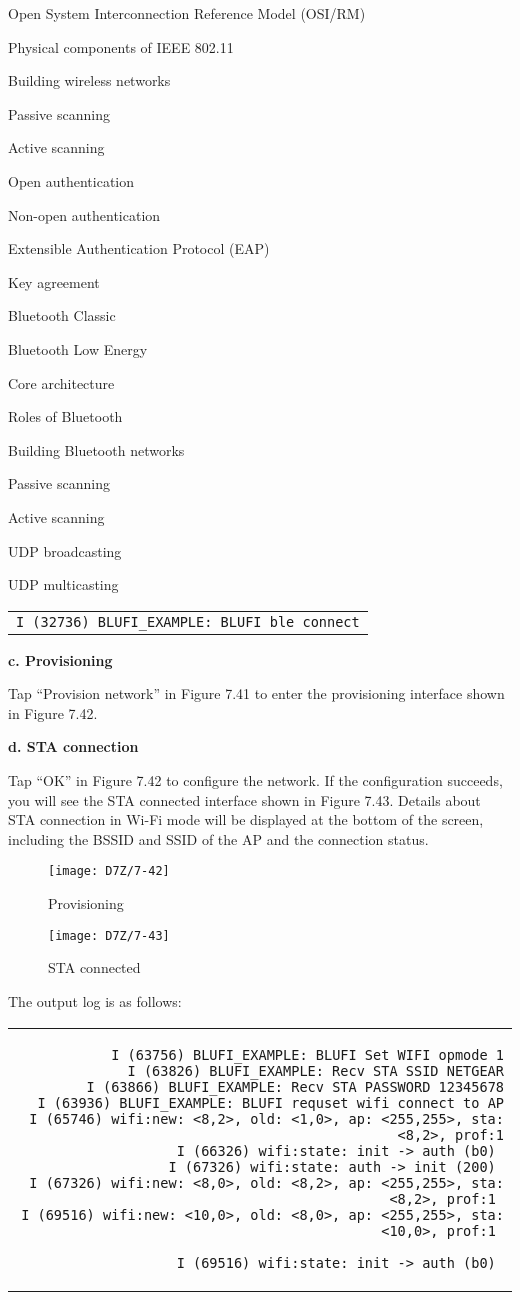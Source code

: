 \documentclass[a4paper,12pt]{book}
\begin{document}
\begin{term}{Open System Interconnection Reference Model (OSI/RM)}
\begin{term}{Physical components of IEEE 802.11}
\begin{term}{Building wireless networks}
\begin{term}{Passive scanning}
\begin{term}{Active scanning}
\begin{term}{Open authentication}
\begin{term}{Non-open authentication}
\begin{term}{Extensible Authentication Protocol (EAP)}
\begin{term}{Key agreement}
\begin{term}{Bluetooth Classic}
\begin{term}{Bluetooth Low Energy}
\begin{term}{Core architecture}
\begin{term}{Roles of Bluetooth}
\begin{term}{Building Bluetooth networks}
\begin{term}{Passive scanning}
\begin{term}{Active scanning}
\begin{term}{UDP broadcasting}
\begin{term}{UDP multicasting}
\begin{tabular}{d}
\verb|I (32736) BLUFI_EXAMPLE: BLUFI ble connect|
\end{tabular}


\textbf{c. Provisioning}

Tap “Provision network” in Figure 7.41 to enter the provisioning interface shown in Figure 7.42.

\textbf{d. STA connection}

Tap “OK” in Figure 7.42 to configure the network. If the configuration succeeds, you will see the STA connected interface shown in Figure 7.43. Details about STA connection in Wi-Fi mode will be displayed at the bottom of the screen, including the BSSID and SSID of the AP and the connection status.

\begin{figure}[!h]
  \Centering
  \begin{minipage}[b]{0.4\textwidth}
    \texttt{[image: D7Z/7-42]}
    \caption{Provisioning}
  \end{minipage}\hspace{2em}
  \begin{minipage}[b]{0.4\textwidth}
    \texttt{[image: D7Z/7-43]}
    \caption{STA connected}
  \end{minipage}
\end{figure}

The output log is as follows:


\fontsize{9.9pt}{9.9pt}\selectfont
\begin{tabular}{d}
\vspace{2pt}
\begin{verbatim}
I (63756) BLUFI_EXAMPLE: BLUFI Set WIFI opmode 1
I (63826) BLUFI_EXAMPLE: Recv STA SSID NETGEAR
I (63866) BLUFI_EXAMPLE: Recv STA PASSWORD 12345678
I (63936) BLUFI_EXAMPLE: BLUFI requset wifi connect to AP
I (65746) wifi:new: <8,2>, old: <1,0>, ap: <255,255>, sta: <8,2>, prof:1
I (66326) wifi:state: init -> auth (b0) 
I (67326) wifi:state: auth -> init (200) 
I (67326) wifi:new: <8,0>, old: <8,2>, ap: <255,255>, sta: <8,2>, prof:1 
I (69516) wifi:new: <10,0>, old: <8,0>, ap: <255,255>, sta: <10,0>, prof:1 
\end{verbatim} 
\verb|I (69516) wifi:state: init -> auth (b0) |
\end{tabular}




\end{term}
\end{term}
\end{term}
\end{term}
\end{term}
\end{term}
\end{term}
\end{term}
\end{term}
\end{term}
\end{term}
\end{term}
\end{term}
\end{term}
\end{term}
\end{term}
\end{term}
\end{term}
\end{document}
